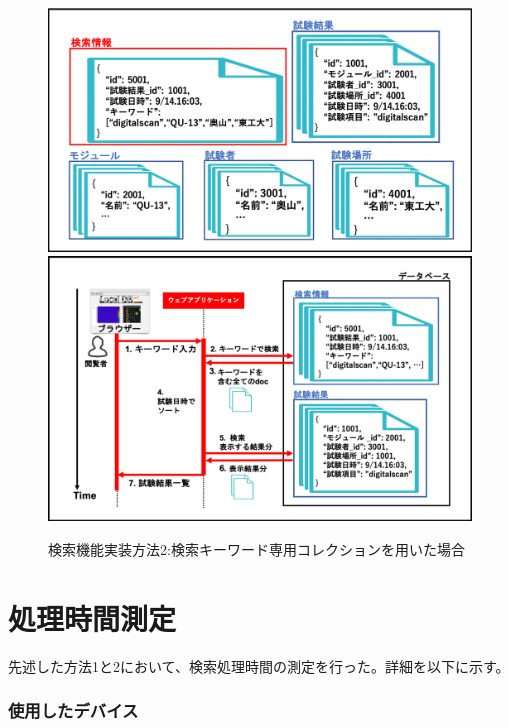 \begin{figure}[bpt]
  \begin{center}
    \includegraphics[width=14cm]{search_mongo_collection}
    \includegraphics[width=14cm]{search_mongo_collection_flow}
  \caption[検索機能実装方法2:検索キーワード専用コレクションを用いた場合]{検索機能実装方法2:検索キーワード専用コレクションを用いた場合}
  \label{search_mongo_collection}
  \end{center}
\end{figure}

\section{処理時間測定} \label{sec:search_process_time_mes}
先述した方法1と2において、検索処理時間の測定を行った。詳細を以下に示す。


\subsubsection{使用したデバイス}

